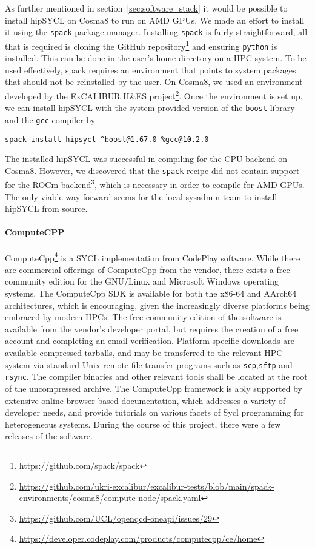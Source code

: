\documentclass[../main]{subfiles}
\begin{document}
As further mentioned in section~\ref{sec:software_stack} it would be possible to install hipSYCL on Cosma8 to run on AMD GPUs.
We made an effort to install it using the \texttt{spack} package manager.
Installing \texttt{spack} is fairly straightforward, all that is required is cloning the GitHub repository\footnote{\url{https://github.com/spack/spack}} and ensuring \texttt{python} is installed.
This can be done in the user's home directory on a HPC system.
To be used effectively, spack requires an environment that points to system packages that should not be reinstalled by the user.
On Cosma8, we used an environment developed by the ExCALIBUR H\&ES project\footnote{\url{https://github.com/ukri-excalibur/excalibur-tests/blob/main/spack-environments/cosma8/compute-node/spack.yaml}}.
Once the environment is set up, we can install hipSYCL with the system-provided version of the \texttt{boost} library and the \texttt{gcc} compiler by
\begin{verbatim}
spack install hipsycl ^boost@1.67.0 %gcc@10.2.0
\end{verbatim}
The installed hipSYCL was successful in compiling for the CPU backend on Cosma8.
However, we discovered that the \texttt{spack} recipe did not contain support for the ROCm backend\footnote{\url{https://github.com/UCL/openqcd-oneapi/issues/29}}, which is necessary in order to compile for AMD GPUs.
The only viable way forward seems for the local sysadmin team to install hipSYCL from source.

\paragraph{ComputeCPP}

ComputeCpp\footnote{\url{https://developer.codeplay.com/products/computecpp/ce/home}} is a SYCL implementation from CodePlay software.
While there are commercial offerings of ComputeCpp from the vendor, there exists a free community edition for the GNU/Linux and Microsoft Windows operating systems.
The ComputeCpp SDK is available for both the x86-64 and AArch64 architectures, which is encouraging, given the increasingly diverse platforms being embraced by modern HPCs. %
The free community edition of the software is available from the vendor's developer portal, but requires the creation of a free account and completing an email verification.
Platform-specific downloads are available compressed tarballs, and may be transferred to the relevant HPC system via standard Unix remote file transfer programs such as \texttt{scp},\texttt{sftp} and \texttt{rsync}.
The compiler binaries and other relevant tools shall be located at the root of the uncompressed archive.
The ComputeCpp framework is ably supported by extensive online browser-based documentation, which addresses a variety of developer needs, and provide tutorials on various facets of Sycl programming for heterogeneous systems.
During the course of this project, there were a few releases of the software.
\end{document}
